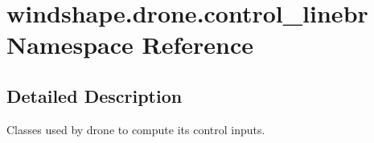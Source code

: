 \hypertarget{namespacewindshape_1_1drone_1_1control__linebr}{}\section{windshape.\+drone.\+control\+\_\+linebr Namespace Reference}
\label{namespacewindshape_1_1drone_1_1control__linebr}


\subsection{Detailed Description}
\begin{DoxyVerb}Classes used by drone to compute its control inputs.
\end{DoxyVerb}
 
